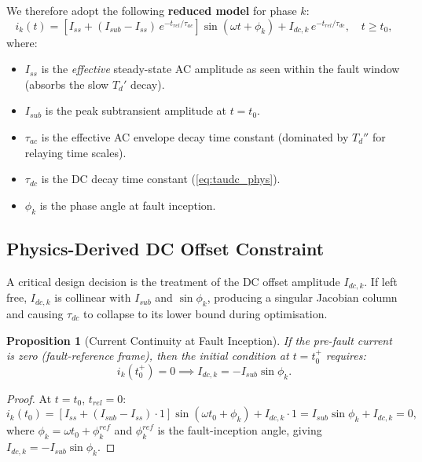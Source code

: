 \documentclass[12pt, a4paper]{article}
\theoremstyle{definition}
\theoremstyle{plain}
\newtheorem{proposition}{Proposition}[section]
\begin{document}
We therefore adopt the following \textbf{reduced model} for phase $k$:
\begin{equation}
  \boxed{
  i_k(t) = \left[I_{ss} + (I_{sub} - I_{ss})\,e^{-t_{rel}/\tau_{ac}}\right]
            \sin(\omega t + \phi_k)
          + I_{dc,k}\,e^{-t_{rel}/\tau_{dc}},
          \quad t \geq t_0,}
  \label{eq:reduced_model}
\end{equation}
where:
\begin{itemize}
  \item $I_{ss}$ is the \emph{effective} steady-state AC amplitude as seen
        within the fault window (absorbs the slow $T_d'$ decay).
  \item $I_{sub}$ is the peak subtransient amplitude at $t = t_0$.
  \item $\tau_{ac}$ is the effective AC envelope decay time constant (dominated
        by $T_d''$ for relaying time scales).
  \item $\tau_{dc}$ is the DC decay time constant (\cref{eq:taudc_phys}).
  \item $\phi_k$ is the phase angle at fault inception.
\end{itemize}

\subsection{Physics-Derived DC Offset Constraint}
\label{sec:model:dc}

A critical design decision is the treatment of the DC offset amplitude
$I_{dc,k}$.  If left free, $I_{dc,k}$ is collinear with $I_{sub}$ and
$\sin\phi_k$, producing a singular Jacobian column and causing $\tau_{dc}$
to collapse to its lower bound during optimisation.

\begin{proposition}[Current Continuity at Fault Inception]
If the pre-fault current is zero (fault-reference frame), then the initial
condition at $t = t_0^+$ requires:
\begin{equation}
  i_k(t_0^+) = 0 \implies I_{dc,k} = -I_{sub}\sin\phi_k.
  \label{eq:dc_constraint}
\end{equation}
\end{proposition}

\begin{proof}
At $t = t_0$, $t_{rel} = 0$:
\[
  i_k(t_0) = [I_{ss} + (I_{sub} - I_{ss})\cdot 1]\sin(\omega t_0 + \phi_k)
            + I_{dc,k}\cdot 1
           = I_{sub}\sin\phi_k + I_{dc,k} = 0,
\]
where $\phi_k = \omega t_0 + \phi_k^{ref}$ and $\phi_k^{ref}$ is the
fault-inception angle, giving $I_{dc,k} = -I_{sub}\sin\phi_k$.
\end{proof}
\end{document}
